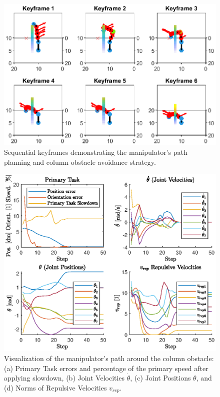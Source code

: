 \documentclass[letterpaper, 10 pt, conference]{ieeeconf}  %
\begin{document}
\begin{figure}
	\centering
	\includegraphics[width=1\linewidth]{keyframes_3D.eps} %
	\caption{Sequential keyframes demonstrating the manipulator's path planning and column obstacle avoidance strategy.}
	\label{fig:keyframes-3d-column}
\end{figure}


\begin{figure}
	\centering
	\includegraphics[width=1\linewidth]{4plots_column.eps} %
	\caption{Visualization of the manipulator's path around the column obstacle: (a) Primary Task errors and percentage of the primary speed after applying slowdown, (b) Joint Velocities $\dot{\theta}$, (c) Joint Positions $\theta$, and (d) Norms of Repulsive Velocities $v_{rep}$.}
	\label{fig:plots-3d-column}
\end{figure}
\end{document}
